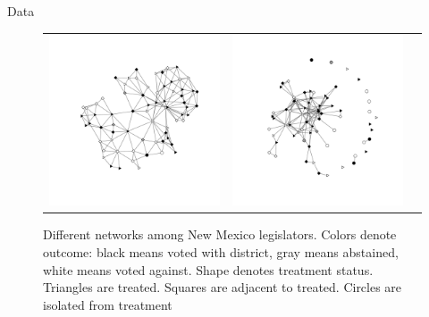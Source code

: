 \documentclass[final]{beamer}
\newlength{\onecolwid}
\newlength{\onecolwidd}
\begin{document}
\begin{frame}[t]
\begin{columns}[t]
\begin{column}{\onecolwidd}
\begin{block}{Data}
\begin{rmfamily}
\begin{figure}
\begin{tabular}{ccc}
	\includegraphics[scale=0.8, clip=true,trim =2cm 2cm 2cm 2cm ]{coppock_geographic_net.pdf} & 
	\includegraphics[scale=0.8, clip=true,trim =2cm 2cm 2cm 2cm]{nm_committee_net.pdf} \\ 
	\end{tabular}
	\vspace*{10mm}
	\caption{Different networks among New Mexico legislators. Colors denote outcome: black means voted with district, gray means abstained, white means voted against. Shape denotes treatment status. Triangles are treated. Squares are adjacent to treated. Circles are isolated from treatment}
	\label{fig:nh-nets}
	\end{figure}


\end{rmfamily}
\end{block}
\end{column}
\end{columns}
\end{frame}
\end{document}
